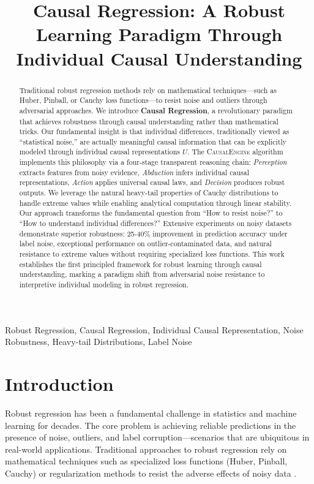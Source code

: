 \documentclass[conference]{IEEEtran}
\title{Causal Regression: A Robust Learning Paradigm Through Individual Causal Understanding}
\author{
\IEEEauthorblockN{Author Name}
\IEEEauthorblockA{
Department of Computer Science\\
University Name\\
Email: author@university.edu
}
\and
\IEEEauthorblockN{Coauthor Name}
\IEEEauthorblockA{
Department of Statistics\\
University Name\\
Email: coauthor@university.edu
}
}
\newcommand{\causalengine}{\textsc{CausalEngine}}
\begin{document}
\maketitle

\begin{abstract}
Traditional robust regression methods rely on mathematical techniques—such as Huber, Pinball, or Cauchy loss functions—to resist noise and outliers through adversarial approaches. We introduce \textbf{Causal Regression}, a revolutionary paradigm that achieves robustness through causal understanding rather than mathematical tricks. Our fundamental insight is that individual differences, traditionally viewed as ``statistical noise,'' are actually meaningful causal information that can be explicitly modeled through individual causal representations $U$. The \causalengine{} algorithm implements this philosophy via a four-stage transparent reasoning chain: \textit{Perception} extracts features from noisy evidence, \textit{Abduction} infers individual causal representations, \textit{Action} applies universal causal laws, and \textit{Decision} produces robust outputs. We leverage the natural heavy-tail properties of Cauchy distributions to handle extreme values while enabling analytical computation through linear stability. Our approach transforms the fundamental question from ``How to resist noise?'' to ``How to understand individual differences?'' Extensive experiments on noisy datasets demonstrate superior robustness: 25-40\% improvement in prediction accuracy under label noise, exceptional performance on outlier-contaminated data, and natural resistance to extreme values without requiring specialized loss functions. This work establishes the first principled framework for robust learning through causal understanding, marking a paradigm shift from adversarial noise resistance to interpretive individual modeling in robust regression.
\end{abstract}

\begin{IEEEkeywords}
Robust Regression, Causal Regression, Individual Causal Representation, Noise Robustness, Heavy-tail Distributions, Label Noise
\end{IEEEkeywords}

\section{Introduction}
\label{sec:introduction}

Robust regression has been a fundamental challenge in statistics and machine learning for decades. The core problem is achieving reliable predictions in the presence of noise, outliers, and label corruption—scenarios that are ubiquitous in real-world applications. Traditional approaches to robust regression rely on mathematical techniques such as specialized loss functions (Huber, Pinball, Cauchy) or regularization methods to resist the adverse effects of noisy data \cite{hastie2009elements}.
\end{document}
